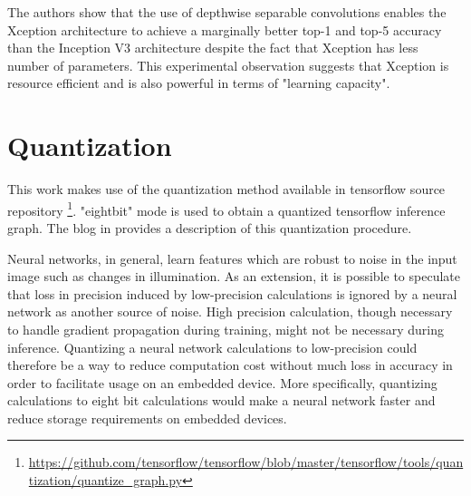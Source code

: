 The authors show that the use of depthwise separable convolutions enables the Xception architecture to achieve a marginally better top-1 and top-5 accuracy than the Inception V3 architecture despite the fact that Xception has less number of parameters. This experimental observation suggests that Xception is resource efficient and is also powerful in terms of "learning capacity".





\section{Quantization}

This work makes use of the quantization method available in tensorflow source repository \footnote{\url{https://github.com/tensorflow/tensorflow/blob/master/tensorflow/tools/quantization/quantize_graph.py}}. "eightbit" mode is used to obtain a quantized tensorflow inference graph. The blog in \cite{quant_blog} provides a description of this quantization procedure.

Neural networks, in general, learn features which are robust to noise in the input image such as changes in illumination. As an extension, it is possible to speculate that loss in precision induced by low-precision calculations is ignored by a neural network as another source of noise. High precision calculation, though necessary to handle gradient propagation during training, might not be necessary during inference. Quantizing a neural network calculations to low-precision could therefore be a way to reduce computation cost without much loss in accuracy in order to facilitate usage on an embedded device. More specifically, quantizing calculations to eight bit calculations would make  a neural network faster and reduce storage requirements on embedded devices. 

